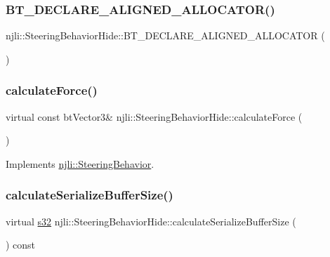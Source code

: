 \subsubsection{\texorpdfstring{B\+T\+\_\+\+D\+E\+C\+L\+A\+R\+E\+\_\+\+A\+L\+I\+G\+N\+E\+D\+\_\+\+A\+L\+L\+O\+C\+A\+T\+O\+R()}{BT\_DECLARE\_ALIGNED\_ALLOCATOR()}}
{\footnotesize\ttfamily njli\+::\+Steering\+Behavior\+Hide\+::\+B\+T\+\_\+\+D\+E\+C\+L\+A\+R\+E\+\_\+\+A\+L\+I\+G\+N\+E\+D\+\_\+\+A\+L\+L\+O\+C\+A\+T\+OR (\begin{DoxyParamCaption}{ }\end{DoxyParamCaption})\hspace{0.3cm}{\ttfamily [protected]}}

\mbox{\label{classnjli_1_1_steering_behavior_hide_a767a29696376d90158523d2aa5fb13d7}} 
\subsubsection{\texorpdfstring{calculate\+Force()}{calculateForce()}}
{\footnotesize\ttfamily virtual const bt\+Vector3\& njli\+::\+Steering\+Behavior\+Hide\+::calculate\+Force (\begin{DoxyParamCaption}{ }\end{DoxyParamCaption})\hspace{0.3cm}{\ttfamily [virtual]}}



Implements \mbox{\hyperlink{classnjli_1_1_steering_behavior_a9720953de1268f658636213946d76ed3}{njli\+::\+Steering\+Behavior}}.

\mbox{\label{classnjli_1_1_steering_behavior_hide_abf96426826554e8c405a08e8a6ca07f6}} 
\subsubsection{\texorpdfstring{calculate\+Serialize\+Buffer\+Size()}{calculateSerializeBufferSize()}}
{\footnotesize\ttfamily virtual \mbox{\hyperlink{_util_8h_aa62c75d314a0d1f37f79c4b73b2292e2}{s32}} njli\+::\+Steering\+Behavior\+Hide\+::calculate\+Serialize\+Buffer\+Size (\begin{DoxyParamCaption}{ }\end{DoxyParamCaption}) const\hspace{0.3cm}{\ttfamily [virtual]}}

